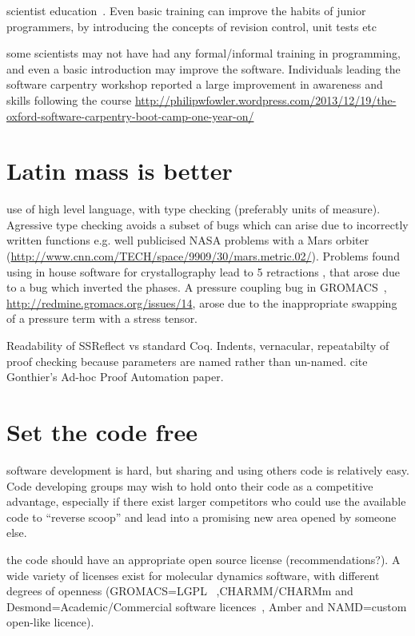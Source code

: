 \documentclass[conference]{IEEEtran}
\begin{document}
scientist education~\cite{Wilson2014}. Even basic training can improve
the habits of junior programmers, by introducing the concepts of
revision control, unit tests etc

some scientists may not have had any formal/informal training in programming, and even a basic introduction may improve the software. Individuals leading the software carpentry workshop reported a large improvement in awareness and skills following the course \url{http://philipwfowler.wordpress.com/2013/12/19/the-oxford-software-carpentry-boot-camp-one-year-on/}


\section{Latin mass is better}

use of high level language, with type checking (preferably units of
measure). Agressive type checking avoids a subset of bugs which can
arise due to incorrectly written functions e.g. well publicised NASA
problems with a Mars orbiter
(\url{http://www.cnn.com/TECH/space/9909/30/mars.metric.02/}). Problems
found using in house software for crystallography lead to 5
retractions \cite{Miller2006}, that arose due to a bug which inverted
the phases. A pressure coupling bug in GROMACS~\cite{Hess2008},
\url{http://redmine.gromacs.org/issues/14}, arose due to the
inappropriate swapping of a pressure term with a stress tensor.

Readability of SSReflect vs standard Coq. Indents, vernacular, repeatabilty of proof checking because parameters are named rather than un-named. 
cite Gonthier's Ad-hoc Proof Automation paper. 

\section{Set the code free} 

software development is hard, but sharing and using others code is
relatively easy. Code developing groups may wish to hold onto their
code as a competitive advantage, especially if there exist larger
competitors who could use the available code to ``reverse scoop'' and
lead into a promising new area opened by someone else.

the code should have an appropriate open source license
(recommendations?). A wide variety of licenses exist for molecular
dynamics software, with different degrees of openness (GROMACS=LGPL~\cite{Hess2008}
,CHARMM/CHARMm and Desmond=Academic/Commercial software licences~\cite{Brooks2009,Bowers2006}, Amber
and NAMD=custom open-like licence).
\end{document}
